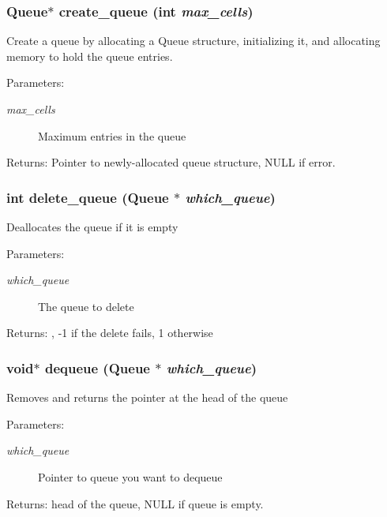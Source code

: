 \subsubsection{\setlength{\rightskip}{0pt plus 5cm}\bf{Queue}$\ast$ create\_\-queue (int {\em max\_\-cells})}\label{queue_8h_b710f6637419a761df20688da7ece206}


Create a queue by allocating a Queue structure, initializing it, and allocating memory to hold the queue entries. \begin{Desc}
\item[Parameters:]
\begin{description}
\item[{\em max\_\-cells}]Maximum entries in the queue \end{description}
\end{Desc}
\begin{Desc}
\item[Returns:]Pointer to newly-allocated queue structure, NULL if error. \end{Desc}
\subsubsection{\setlength{\rightskip}{0pt plus 5cm}int delete\_\-queue (\bf{Queue} $\ast$ {\em which\_\-queue})}\label{queue_8h_9ae1c24d5e582f72941ff841dcd08f01}


Deallocates the queue if it is empty \begin{Desc}
\item[Parameters:]
\begin{description}
\item[{\em which\_\-queue}]The queue to delete \end{description}
\end{Desc}
\begin{Desc}
\item[Returns:], -1 if the delete fails, 1 otherwise \end{Desc}
\subsubsection{\setlength{\rightskip}{0pt plus 5cm}void$\ast$ dequeue (\bf{Queue} $\ast$ {\em which\_\-queue})}\label{queue_8h_a150371d99ffab3f34b09efa4669a47b}


Removes and returns the pointer at the head of the queue \begin{Desc}
\item[Parameters:]
\begin{description}
\item[{\em which\_\-queue}]Pointer to queue you want to dequeue \end{description}
\end{Desc}
\begin{Desc}
\item[Returns:]head of the queue, NULL if queue is empty. \end{Desc}
